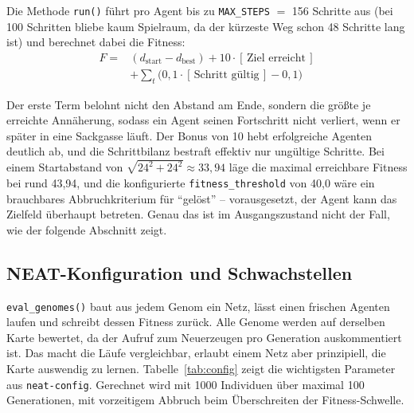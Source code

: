 \documentclass[sigconf]{acmart}
\begin{document}
Die Methode \texttt{run()} führt pro Agent bis zu \texttt{MAX\_STEPS} $=$ 156 Schritte aus (bei 100 Schritten bliebe kaum Spielraum, da der kürzeste Weg schon 48 Schritte lang ist) und berechnet dabei die Fitness:
\begin{equation}
  \begin{split}
    F ={} & (d_{\text{start}} - d_{\text{best}}) + 10 \cdot [\,\text{Ziel erreicht}\,] \\
          & + \sum_{t} \big(0{,}1 \cdot [\,\text{Schritt gültig}\,] - 0{,}1\big)
  \end{split}
\end{equation}

Der erste Term belohnt nicht den Abstand am Ende, sondern die größte je erreichte Annäherung, sodass ein Agent seinen Fortschritt nicht verliert, wenn er später in eine Sackgasse läuft. Der Bonus von 10 hebt erfolgreiche Agenten deutlich ab, und die Schrittbilanz bestraft effektiv nur ungültige Schritte. Bei einem Startabstand von $\sqrt{24^2+24^2} \approx 33{,}94$ läge die maximal erreichbare Fitness bei rund 43,94, und die konfigurierte \texttt{fitness\_threshold} von 40,0 wäre ein brauchbares Abbruchkriterium für \enquote{gelöst} -- vorausgesetzt, der Agent kann das Zielfeld überhaupt betreten. Genau das ist im Ausgangszustand nicht der Fall, wie der folgende Abschnitt zeigt.

\subsection{NEAT-Konfiguration und Schwachstellen}
\label{sec:schwachstellen}
\texttt{eval\_genomes()} baut aus jedem Genom ein Netz, lässt einen frischen Agenten laufen und schreibt dessen Fitness zurück. Alle Genome werden auf derselben Karte bewertet, da der Aufruf zum Neuerzeugen pro Generation auskommentiert ist. Das macht die Läufe vergleichbar, erlaubt einem Netz aber prinzipiell, die Karte auswendig zu lernen. Tabelle~\ref{tab:config} zeigt die wichtigsten Parameter aus \texttt{neat-config}. Gerechnet wird mit 1000 Individuen über maximal 100 Generationen, mit vorzeitigem Abbruch beim Überschreiten der Fitness-Schwelle.
\end{document}

